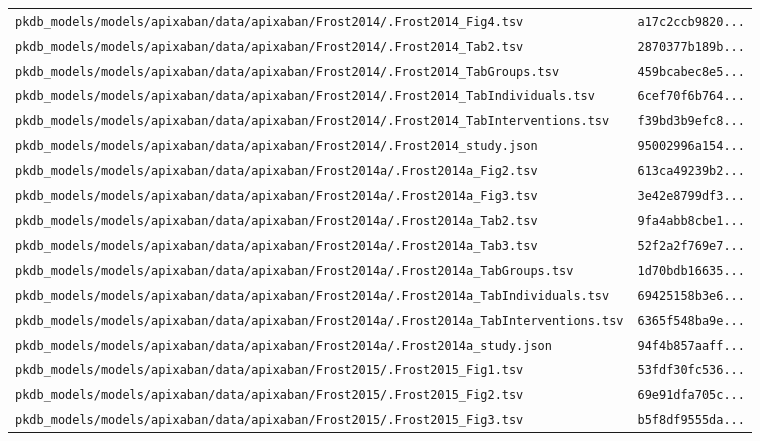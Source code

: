 \documentclass{article}
\begin{document}
\begin{longtable}{ll}
\texttt{pkdb\_models/models/apixaban/data/apixaban/Frost2014/.Frost2014\_Fig4.tsv} & \texttt{a17c2ccb9820...} \\
\texttt{pkdb\_models/models/apixaban/data/apixaban/Frost2014/.Frost2014\_Tab2.tsv} & \texttt{2870377b189b...} \\
\texttt{pkdb\_models/models/apixaban/data/apixaban/Frost2014/.Frost2014\_TabGroups.tsv} & \texttt{459bcabec8e5...} \\
\texttt{pkdb\_models/models/apixaban/data/apixaban/Frost2014/.Frost2014\_TabIndividuals.tsv} & \texttt{6cef70f6b764...} \\
\texttt{pkdb\_models/models/apixaban/data/apixaban/Frost2014/.Frost2014\_TabInterventions.tsv} & \texttt{f39bd3b9efc8...} \\
\texttt{pkdb\_models/models/apixaban/data/apixaban/Frost2014/.Frost2014\_study.json} & \texttt{95002996a154...} \\
\texttt{pkdb\_models/models/apixaban/data/apixaban/Frost2014a/.Frost2014a\_Fig2.tsv} & \texttt{613ca49239b2...} \\
\texttt{pkdb\_models/models/apixaban/data/apixaban/Frost2014a/.Frost2014a\_Fig3.tsv} & \texttt{3e42e8799df3...} \\
\texttt{pkdb\_models/models/apixaban/data/apixaban/Frost2014a/.Frost2014a\_Tab2.tsv} & \texttt{9fa4abb8cbe1...} \\
\texttt{pkdb\_models/models/apixaban/data/apixaban/Frost2014a/.Frost2014a\_Tab3.tsv} & \texttt{52f2a2f769e7...} \\
\texttt{pkdb\_models/models/apixaban/data/apixaban/Frost2014a/.Frost2014a\_TabGroups.tsv} & \texttt{1d70bdb16635...} \\
\texttt{pkdb\_models/models/apixaban/data/apixaban/Frost2014a/.Frost2014a\_TabIndividuals.tsv} & \texttt{69425158b3e6...} \\
\texttt{pkdb\_models/models/apixaban/data/apixaban/Frost2014a/.Frost2014a\_TabInterventions.tsv} & \texttt{6365f548ba9e...} \\
\texttt{pkdb\_models/models/apixaban/data/apixaban/Frost2014a/.Frost2014a\_study.json} & \texttt{94f4b857aaff...} \\
\texttt{pkdb\_models/models/apixaban/data/apixaban/Frost2015/.Frost2015\_Fig1.tsv} & \texttt{53fdf30fc536...} \\
\texttt{pkdb\_models/models/apixaban/data/apixaban/Frost2015/.Frost2015\_Fig2.tsv} & \texttt{69e91dfa705c...} \\
\texttt{pkdb\_models/models/apixaban/data/apixaban/Frost2015/.Frost2015\_Fig3.tsv} & \texttt{b5f8df9555da...} \\

\end{longtable}
\end{document}

